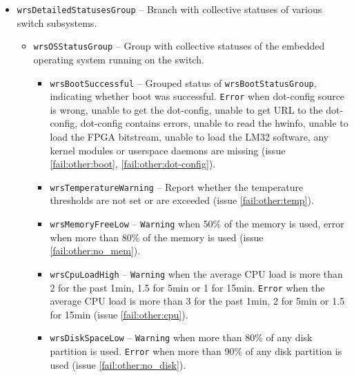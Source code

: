 \begin{itemize}
  \item \texttt{wrsDetailedStatusesGroup} -- Branch with collective statuses of
	various switch subsystems.
    \begin{itemize}
      \item \texttt{wrsOSStatusGroup} -- Group with collective statuses of the
        embedded operating system running on the switch.
      \begin{itemize}
        \item \texttt{wrsBootSuccessful} -- Grouped status of
          \texttt{wrsBootStatusGroup}, indicating whether boot was successful.
          \texttt{Error} when dot-config source is wrong, unable to get the dot-config,
          unable to get URL to the dot-config,
          dot-config contains errors, unable to read the hwinfo, unable to load
          the FPGA bitstream, unable to load the LM32 software, any kernel
          modules or userspace daemons are missing (issue \ref{fail:other:boot},
          \ref{fail:other:dot-config}).
        \item \texttt{wrsTemperatureWarning} -- Report whether the temperature
          thresholds are not set or are exceeded (issue \ref{fail:other:temp}).
        \item \texttt{wrsMemoryFreeLow} -- \texttt{Warning} when 50\% of the memory is
          used, error when more than 80\% of the memory is used (issue
          \ref{fail:other:no_mem}).
        \item \texttt{wrsCpuLoadHigh} -- \texttt{Warning} when the average CPU load is
          more than 2 for the past 1min, 1.5 for 5min or 1 for 15min.
          \texttt{Error} when the average CPU load is more than 3 for the past
          1min, 2 for 5min or 1.5 for 15min (issue \ref{fail:other:cpu}).
        \item \texttt{wrsDiskSpaceLow} -- \texttt{Warning} when more than 80\% of any
          disk partition is used. \texttt{Error} when more than 90\% of any disk
          partition is used (issue \ref{fail:other:no_disk}).
      \end{itemize}


\end{itemize}
\end{itemize}
